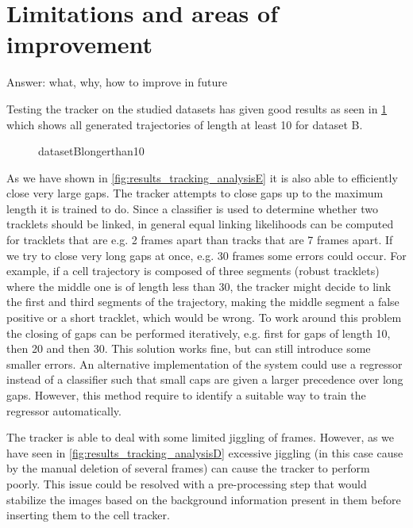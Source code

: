 \section{Limitations and areas of improvement \statusnew}
	\label{sec:results_limitations}
	
	Answer: what, why, how to improve in future
	
	Testing the tracker on the studied datasets has given good results as seen in \cref{fig:tracking_results_datasetBlongerthan10} which shows all generated trajectories of length at least 10 for dataset B.
	
	\begin{figure}[h]
		\centering
		\caption{datasetBlongerthan10}
		\label{fig:tracking_results_datasetBlongerthan10}
	\end{figure}
	
	As we have shown in \cref{fig:results_tracking_analysisE} it is also able to efficiently close very large gaps. The tracker attempts to close gaps up to the maximum length it is trained to do. Since a classifier is used to determine whether two tracklets should be linked, in general equal linking likelihoods can be computed for tracklets that are e.g. 2 frames apart than tracks that are 7 frames apart. If we try to close very long gaps at once, e.g. 30 frames some errors could occur. For example, if a cell trajectory is composed of three segments (robust tracklets) where the middle one is of length less than 30, the tracker might decide to link the first and third segments of the trajectory, making the middle segment a false positive or a short tracklet, which would be wrong. To work around this problem the closing of gaps can be performed iteratively, e.g. first for gaps of length 10, then 20 and then 30. This solution works fine, but can still introduce some smaller errors. An alternative implementation of the system could use a regressor instead of a classifier such that small caps are given a larger precedence over long gaps. However, this method require to identify a suitable way to train the regressor automatically.
	
	The tracker is able to deal with some limited jiggling of frames. However, as we have seen in \cref{fig:results_tracking_analysisD} excessive jiggling (in this case cause by the manual deletion of several frames) can cause the tracker to perform poorly. This issue could be resolved with a pre-processing step that would stabilize the images based on the background information present in them before inserting them to the cell tracker.
	
